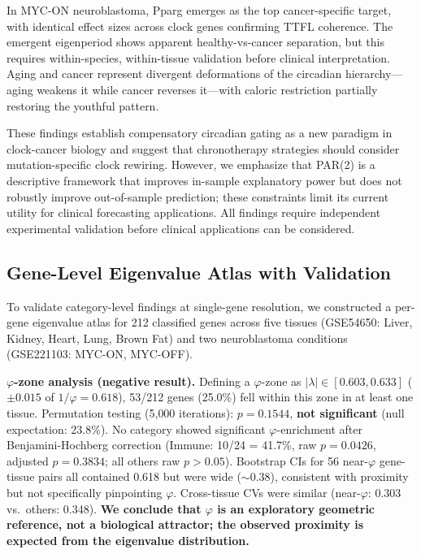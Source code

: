 \documentclass[11pt,a4paper]{article}
\begin{document}
In MYC-ON neuroblastoma, Pparg emerges as the top cancer-specific target, with identical effect sizes across clock genes confirming TTFL coherence. The emergent eigenperiod shows apparent healthy-vs-cancer separation, but this requires within-species, within-tissue validation before clinical interpretation. Aging and cancer represent divergent deformations of the circadian hierarchy---aging weakens it while cancer reverses it---with caloric restriction partially restoring the youthful pattern.

These findings establish compensatory circadian gating as a new paradigm in clock-cancer biology and suggest that chronotherapy strategies should consider mutation-specific clock rewiring. However, we emphasize that PAR(2) is a descriptive framework that improves in-sample explanatory power but does not robustly improve out-of-sample prediction; these constraints limit its current utility for clinical forecasting applications. All findings require independent experimental validation before clinical applications can be considered.

\subsection{Gene-Level Eigenvalue Atlas with Validation}

To validate category-level findings at single-gene resolution, we constructed a per-gene eigenvalue atlas for 212 classified genes across five tissues (GSE54650: Liver, Kidney, Heart, Lung, Brown Fat) and two neuroblastoma conditions (GSE221103: MYC-ON, MYC-OFF).

\textbf{$\varphi$-zone analysis (negative result).} Defining a $\varphi$-zone as $|\lambda| \in [0.603, 0.633]$ ($\pm 0.015$ of $1/\varphi = 0.618$), 53/212 genes (25.0\%) fell within this zone in at least one tissue. Permutation testing (5{,}000 iterations): $p = 0.1544$, \textbf{not significant} (null expectation: 23.8\%). No category showed significant $\varphi$-enrichment after Benjamini-Hochberg correction (Immune: 10/24 = 41.7\%, raw $p = 0.0426$, adjusted $p = 0.3834$; all others raw $p > 0.05$). Bootstrap CIs for 56 near-$\varphi$ gene-tissue pairs all contained 0.618 but were wide ($\sim$0.38), consistent with proximity but not specifically pinpointing $\varphi$. Cross-tissue CVs were similar (near-$\varphi$: 0.303 vs.\ others: 0.348). \textbf{We conclude that $\varphi$ is an exploratory geometric reference, not a biological attractor; the observed proximity is expected from the eigenvalue distribution.}
\end{document}
